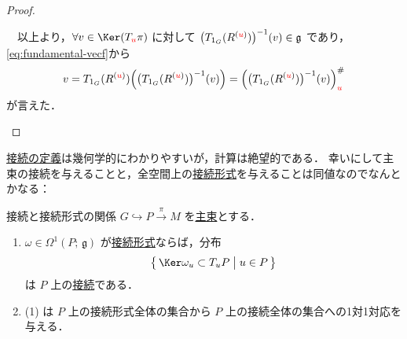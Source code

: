 \documentclass[TQFT_main]{subfiles}
\begin{document}
\begin{proof}
\begin{description}
        　以上より，$\forall v \in \Ker (T_{\textcolor{red}{u}} \pi)$ に対して $\bigl(T_{1_G} (R^{(\textcolor{red}{u})})\bigr)^{-1}(v) \in \mathfrak{g}$ であり，\eqref{eq:fundamental-vecf}から
        \begin{align}
            v = T_{1_G} (R^{(\textcolor{red}{u})}) \Bigl( \bigl(T_{1_G} (R^{(\textcolor{red}{u})})\bigr)^{-1}(v)\Bigr) = \Bigl(\bigl(T_{1_G} (R^{(\textcolor{red}{u})})\bigr)^{-1}(v)\Bigr)^\#_{\textcolor{red}{u}}
        \end{align}
        が言えた．
    \end{description}

\end{proof}

\hyperref[def:connection]{接続の定義}は幾何学的にわかりやすいが，計算は絶望的である．
幸いにして主束の接続を与えることと，全空間上の\hyperref[def:connection]{接続形式}を与えることは同値なのでなんとかなる：

\begin{mytheo}[label=thm:connection-basic]{接続と接続形式の関係}
    $G \hookrightarrow P \xrightarrow{\pi} M$ を\hyperref[def.PFD]{主束}とする．
    \begin{enumerate}
        \item $\omega \in \Omega^1(P;\, \mathfrak{g})$ が\hyperref[def:connection]{接続形式}ならば，分布 
        \begin{align}
            \bigl\{\, \Ker \omega_u \subset T_u P\bigm| u \in P \,\bigr\} 
        \end{align}
        は $P$ 上の\hyperref[def:connection]{接続}である．
        \item (1) は $P$ 上の接続形式全体の集合から $P$ 上の接続全体の集合への1対1対応を与える．
    \end{enumerate}
\end{mytheo}
\end{document}
